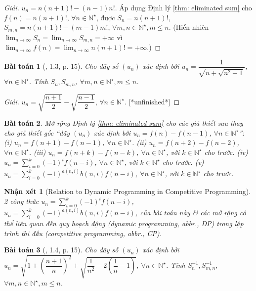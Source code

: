 \documentclass{article}
\newtheorem{baitoan}{Bài toán}
\newtheorem{nhanxet}{Nhận xét}
\begin{document}
\begin{proof}[Giải]
	$u_n = n(n + 1)! - (n - 1)n!$. Áp dụng Định lý \ref{thm: eliminated sum} cho $f(n) = n(n + 1)!$, $\forall n\in\mathbb{N}^\star$, được $S_n = n(n + 1)!$, $S_{m,n} = n(n + 1)! - (m - 1)m!$, $\forall m,n\in\mathbb{N}^\star,m\le n$. (Hiển nhiên $\lim_{n\to\infty} S_n = \lim_{n\to\infty} S_{m,n} = +\infty$ vì $\lim_{n\to\infty} f(n) = \lim_{n\to\infty} n(n + 1)! = +\infty$.)
\end{proof}

\begin{baitoan}[\cite{Quoc_Long_Dat_Nam_VMC}, 1.3, p. 15]
	Cho dãy số $(u_n)$ xác định bởi $u_n = \dfrac{1}{\sqrt{n + \sqrt{n^2 - 1}}}$, $\forall n\in\mathbb{N}^\star$. Tính $S_n,S_{m,n}$, $\forall m,n\in\mathbb{N}^\star,m\le n$.
\end{baitoan}

\begin{proof}[Giải]
	$u_n = \sqrt{\dfrac{n + 1}{2}} - \sqrt{\dfrac{n - 1}{2}}$, $\forall n\in\mathbb{N}^\star$. [*unfinished*]
\end{proof}

\begin{baitoan}
	Mở rộng Định lý \ref{thm: eliminated sum} cho các giả thiết sau thay cho giả thiết gốc ``dãy $(u_n)$ xác định bởi $u_n = f(n) - f(n - 1)$, $\forall n\in\mathbb{N}^\star$'': (i) $u_n = f(n+1) - f(n-1)$, $\forall n\in\mathbb{N}^\star$. (ii) $u_n = f(n+2) - f(n-2)$, $\forall n\in\mathbb{N}^\star$. (iii) $u_n = f(n+k) - f(n-k)$, $\forall n\in\mathbb{N}^\star$, với $k\in\mathbb{N}^\star$ cho trước. (iv) $u_n = \sum_{i=0}^k (-1)^i f(n-i)$, $\forall n\in\mathbb{N}^\star$, với $k\in\mathbb{N}^\star$ cho trước. (v) $u_n = \sum_{i=0}^k (-1)^{a(n,i)}b(n,i)f(n-i)$, $\forall n\in\mathbb{N}^\star$, với $k\in\mathbb{N}^\star$ cho trước.
\end{baitoan}

\begin{nhanxet}[Relation to Dynamic Programming in Competitive Programming]
	2 công thức $u_n = \sum_{i=0}^k (-1)^i f(n-i)$, $u_n = \sum_{i=0}^k (-1)^{a(n,i)}b(n,i)f(n-i)$, của bài toán này \& các mở rộng có thể liên quan đến quy hoạch động (dynamic programming, abbr., DP) trong lập trình thi đấu (competitive programming, abbr., CP).
\end{nhanxet}

\begin{baitoan}[\cite{Quoc_Long_Dat_Nam_VMC}, 1.4, p. 15]
	Cho dãy số $(u_n)$ xác định bởi $u_n = \sqrt{1 + \left(\dfrac{n + 1}{n}\right)^2} + \sqrt{\dfrac{1}{n^2} - 2\left(\dfrac{1}{n} - 1\right)}$, $\forall n\in\mathbb{N}^\star$. Tính $S_n^{-1},S_{m,n}^{-1}$, $\forall m,n\in\mathbb{N}^\star,m\le n$.
\end{baitoan}
\end{document}
